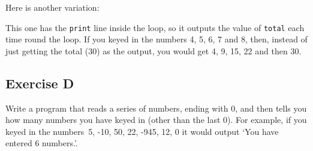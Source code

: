 
Here is another variation:


This one has the \texttt{print} line inside the loop, so it outputs the value
of \texttt{total} each time round the loop.  If you keyed in the numbers
4, 5, 6, 7 and 8, then, instead of just getting the total (30) as the output,
you would get 4, 9, 15, 22 and then 30.

\subsection*{Exercise D}

Write a program that reads a series of numbers, ending with 0, and then tells you how
many numbers you have keyed in (other than the last 0).  For example, if you keyed in the
numbers~5, -10, 50, 22, -945, 12, 0 it would output `You have entered 6
numbers.'.










